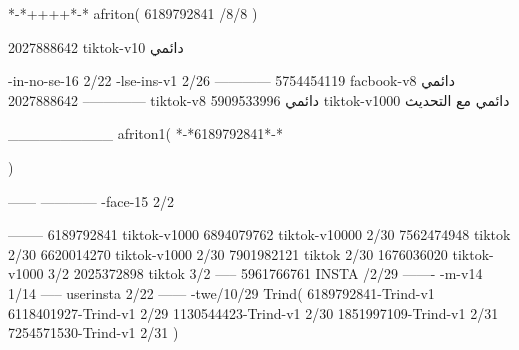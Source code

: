 *-*++++*-*
afriton(
6189792841 /8/8
)

2027888642 tiktok-v10
دائمي

-in-no-se-16 2/22
-lse-ins-v1 2/26
------------
5754454119 facbook-v8
دائمي
--------------
2027888642 tiktok-v8
دائمي
5909533996 tiktok-v1000
دائمي مع التحديث

__________
afriton1(
*-*6189792841*-*

)


------
------------
-face-15 2/2

--------
6189792841 tiktok-v1000
6894079762 tiktok-v10000 2/30
7562474948 tiktok 2/30
6620014270 tiktok-v1000 2/30
7901982121 tiktok 2/30
1676036020 tiktok-v1000 3/2
2025372898 tiktok  3/2
-----
5961766761 INSTA /2/29
-------
-m-v14 1/14
-----
userinsta 2/22
------
-twe/10/29
Trind(
6189792841-Trind-v1 
6118401927-Trind-v1 2/29
1130544423-Trind-v1 2/30
1851997109-Trind-v1 2/31
7254571530-Trind-v1 2/31
)
